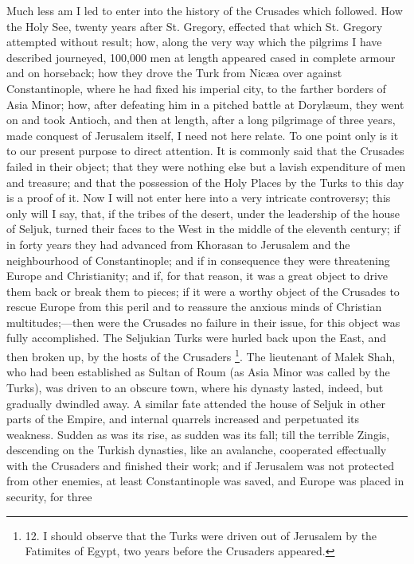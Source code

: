 Much less am I led to enter
into the history of the Crusades which followed. How the Holy See,
twenty years after St. Gregory, effected that which St. Gregory
attempted without result; how, along the very way which the pilgrims I
have described journeyed, 100,000 men at length appeared cased in
complete armour and on horseback; how they drove the Turk from Nicæa
over against Constantinople, where he had fixed his imperial city, to
the farther borders of Asia Minor; how, after defeating him in a
pitched battle at Dorylæum, they went on and took Antioch, and then
at length, after a long pilgrimage of three years, made conquest of
Jerusalem itself, I need not here relate. To one point only is it to
our present purpose to direct attention. It is commonly said that the
Crusades failed in their object; that they were nothing else but a
lavish expenditure of men and treasure; and that the possession of the
Holy Places by the Turks to this day is a proof of it. Now I will not
enter here into a very intricate controversy; this only will I say,
that, if the tribes of the desert, under the leadership of the house
of Seljuk, turned their faces to the West in the middle of the
eleventh century; if in forty years they had advanced from Khorasan to
Jerusalem and the neighbourhood of Constantinople; and if in
consequence they were threatening Europe and Christianity; and if, for
that reason, it was a great object to drive them back or break them to
pieces; if it were a worthy object of the Crusades to rescue Europe
from this peril and to reassure the anxious minds of Christian
multitudes;—then were the Crusades no failure in their issue, for
this object was fully accomplished. The Seljukian Turks were hurled
back upon the East, and then broken up, by the hosts of the Crusaders
\footnote{12.
I should observe that the Turks were driven out of Jerusalem by the
Fatimites of Egypt, two years before the Crusaders appeared.}. The lieutenant of
Malek Shah, who had been established as Sultan of Roum (as Asia Minor
was called by the Turks), was driven to an obscure town, where his
dynasty lasted, indeed, but gradually dwindled away. A similar fate
attended the house of Seljuk in other parts of the Empire, and
internal quarrels increased and perpetuated its weakness. Sudden as
was its rise, as sudden was its fall; till the terrible Zingis,
descending on the Turkish dynasties, like an avalanche,
cooperated effectually with the Crusaders and finished their work; and
if Jerusalem was not protected from other enemies, at least
Constantinople was saved, and Europe was placed in security, for three
